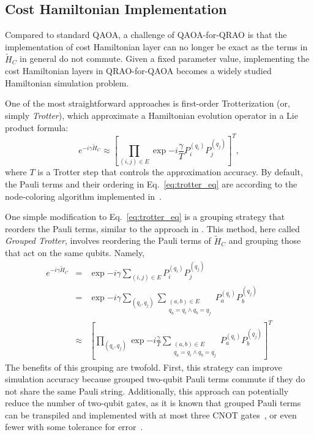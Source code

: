 \documentclass[conference,10pt]{IEEEtran}
\newcommand{\QAOAQRAO}{QAOA-for-QRAO}
\begin{document}
\subsection{Cost Hamiltonian Implementation}
Compared to standard QAOA, a challenge of \QAOAQRAO{} is that the implementation of cost Hamiltonian layer can no longer be exact as the terms in $\tilde{H}_C$ in general do not commute.
Given a fixed parameter value, implementing the cost Hamiltonian layers in QRAO-for-QAOA becomes a widely studied Hamiltonian simulation problem.

One of the most straightforward approaches is first-order Trotterization
(or, simply \emph{Trotter}), which approximate a Hamiltonian evolution operator in a Lie product formula:
\begin{equation}\label{eq:trotter_eq}
    e^{-i \gamma \tilde{H}_C} \approx {\left[ \prod_{(i,j) \in E} \exp{ -i \frac{\gamma}{T} P^{(q_i)}_i P^{(q_j)}_j } \right]}^T,
\end{equation}
where $T$ is a Trotter step that controls the approximation accuracy. By default, the Pauli terms and their ordering in Eq.~\eqref{eq:trotter_eq} are according to the node-coloring algorithm implemented in~\cite{Fulleretal2024}. %

One simple modification to Eq.~\eqref{eq:trotter_eq} is a grouping strategy that reorders the Pauli terms, similar to the approach in \cite{9248636, gui2020term}. This method, here called \emph{Grouped Trotter}, involves reordering the Pauli terms of $\tilde{H}_C$ and grouping those that act on the same qubits. Namely, 
\small{
\begin{eqnarray}
    e^{-i \gamma \tilde{H}_C}  &=& \exp{-i \gamma \sum_{(i,j)\in E} P^{(q_i)}_iP^{(q_j)}_j} \nonumber \\
                               &=& \exp{-i \gamma \sum_{(q_i, q_j)} \sum_{\substack{(a,b)\in E \\ q_a = q_i \land q_b = q_j}} P^{(q_i)}_a P^{(q_j)}_b}\nonumber\\
                               &\approx& {\left[ \prod_{(q_i,q_j)} \exp{ -i \frac{\gamma}{T} \sum_{\substack{ (a,b)\in E \\ q_a = q_i \land q_b = q_j}} P^{(q_i)}_a P^{(q_j)}_b } \right]}^T
                               \label{eq:trotter_eq_grouped}
\end{eqnarray}
}
The benefits of this grouping are twofold. First, this strategy can improve simulation accuracy because grouped two-qubit Pauli terms commute if they do not share the same Pauli string. 
Additionally, this approach can potentially reduce the number of two-qubit gates, as it is known that grouped Pauli terms can be transpiled and implemented with at most three CNOT gates~\cite{shende2003minimal}, or even fewer with some tolerance for error~\cite{cross2019validating}.
\end{document}
